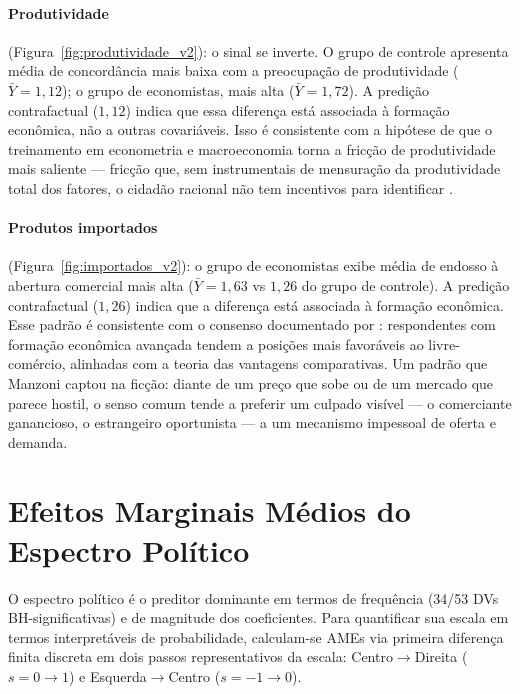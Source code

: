 \paragraph{Produtividade} (Figura~\ref{fig:produtividade_v2}): o sinal se inverte. O grupo de controle apresenta média de concordância mais baixa com a preocupação de produtividade ($\bar{Y} = 1{,}12$); o grupo de economistas, mais alta ($\bar{Y} = 1{,}72$). A predição contrafactual ($1{,}12$) indica que essa diferença está associada à formação econômica, não a outras covariáveis. Isso é consistente com a hipótese de que o treinamento em econometria e macroeconomia torna a fricção de produtividade mais saliente — fricção que, sem instrumentais de mensuração da produtividade total dos fatores, o cidadão racional não tem incentivos para identificar \cite{downs1957economic}.

\paragraph{Produtos importados} (Figura~\ref{fig:importados_v2}): o grupo de economistas exibe média de endosso à abertura comercial mais alta ($\bar{Y} = 1{,}63$ vs $1{,}26$ do grupo de controle). A predição contrafactual ($1{,}26$) indica que a diferença está associada à formação econômica. Esse padrão é consistente com o consenso documentado por : respondentes com formação econômica avançada tendem a posições mais favoráveis ao livre-comércio, alinhadas com a teoria das vantagens comparativas. Um padrão que Manzoni captou na ficção: diante de um preço que sobe ou de um mercado que parece hostil, o senso comum tende a preferir um culpado visível — o comerciante ganancioso, o estrangeiro oportunista — a um mecanismo impessoal de oferta e demanda.

\section{Efeitos Marginais Médios do Espectro Político}
\label{sec:ame-espectro}

O espectro político é o preditor dominante em termos de frequência (34/53 DVs BH-significativas) e de magnitude dos coeficientes. Para quantificar sua escala em termos interpretáveis de probabilidade, calculam-se AMEs via primeira diferença finita discreta em dois passos representativos da escala: Centro$\to$Direita ($s=0\to1$) e Esquerda$\to$Centro ($s=-1\to0$).



